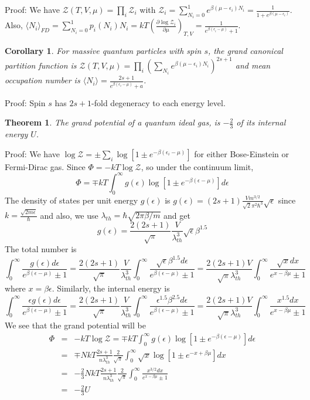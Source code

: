\documentclass[a4paper]{article}
\theoremstyle{new}
\newtheorem{thm}{Theorem}[section]
\newtheorem{cor}{Corollary}[section]
\begin{document}
Proof: We have $\mathcal{Z}(T,V,\mu)=\prod_i\mathcal{Z}_i$ with $\mathcal{Z}_i=\sum_{N_i=0}^1e^{\beta(\mu-\epsilon_i)N_i}=\frac{1}{1+e^{\beta(\mu-\epsilon_i)}}$. Also, $\langle N_i\rangle_{FD}=\sum_{N_i=0}^1p_i(N_i)N_i=kT(\frac{\partial\log\mathcal{Z}_i}{\partial\mu})_{T,V}=\frac{1}{e^{\beta(\epsilon_i-\mu)}+1}$.
\begin{cor}
For massive quantum particles with spin $s$, the grand canonical partition function is $\mathcal{Z}(T,V,\mu)=\prod_i(\sum_{N_i}e^{\beta(\mu-\epsilon_i)N_i})^{2s+1}$ and mean occupation number is $\langle N_i\rangle=\frac{2s+1}{e^{\beta(\epsilon_i-\mu)}+a}$.
\end{cor}
Proof: Spin $s$ has $2s+1$-fold degeneracy to each energy level.
\begin{thm}
The grand potential of a quantum ideal gas, is $-\frac{2}{3}$ of its internal energy $U$.
\end{thm}
Proof: We have $\log\mathcal{Z}=\pm\sum_i\log[1\pm e^{-\beta(\epsilon_i-\mu)}]$ for either Bose-Einstein or Fermi-Dirac gas. Since $\Phi=-kT\log\mathcal{Z}$, so under the continuum limit,
$$\Phi=\mp kT\int_0^\infty g(\epsilon)\log[1\pm e^{-\beta(\epsilon-\mu)}]d\epsilon$$
The density of states per unit energy $g(\epsilon)$ is $g(\epsilon)=(2s+1)\frac{Vm^{3/2}}{\sqrt{2}\pi^2\hbar^3}\sqrt{\epsilon}$ since $k=\frac{\sqrt{2m\epsilon}}{\hbar}$ and also, we use $\lambda_{th}=\hbar\sqrt{2\pi\beta/m}$ and get
$$g(\epsilon)=\frac{2(2s+1)}{\sqrt{\pi}}\frac{V}{\lambda_{th}^3}\sqrt{\epsilon}\beta^{1.5}$$
The total number is $$\int_0^\infty\frac{g(\epsilon)d\epsilon}{e^{\beta(\epsilon-\mu)}\pm1}=\frac{2(2s+1)}{\sqrt{\pi}}\frac{V}{\lambda_{th}^3}\int_0^\infty\frac{\sqrt{\epsilon}\beta^{1.5}d\epsilon}{e^{\beta(\epsilon-\mu)}\pm1}=\frac{2(2s+1)V}{\sqrt{\pi}\lambda_{th}^3}\int_0^\infty\frac{\sqrt{x}dx}{e^{x-\beta\mu}\pm1}$$
where $x=\beta\epsilon$. Similarly, the internal energy is
$$\int_0^\infty\frac{\epsilon g(\epsilon)d\epsilon}{e^{\beta(\epsilon-\mu)}\pm1}=\frac{2(2s+1)}{\sqrt{\pi}}\frac{V}{\lambda_{th}^3}\int_0^\infty\frac{\epsilon^{1.5}\beta^{2.5}d\epsilon}{e^{\beta(\epsilon-\mu)}\pm1}=\frac{2(2s+1)V}{\sqrt{\pi}\lambda_{th}^3}\int_0^\infty\frac{x^{1.5}dx}{e^{x-\beta\mu}\pm1}$$
We see that the grand potential will be
\begin{eqnarray}
\Phi&=&-kT\log\mathcal{Z}=\mp kT\int_0^\infty g(\epsilon)\log[1\pm e^{-\beta(\epsilon-\mu)}]d\epsilon\nonumber\\&=&\mp NkT\frac{2s+1}{n\lambda_{th}^3}\frac{2}{\sqrt{\pi}}\int_0^\infty\sqrt{x}\log[1\pm e^{-x+\beta\mu}]dx\nonumber\\&=&-\frac{2}{3}NkT\frac{2s+1}{n\lambda_{th}^3}\frac{2}{\sqrt{\pi}}\int_0^\infty\frac{x^{3/2}dx}{e^{x-\beta\mu}\pm1}\nonumber\\&=&-\frac{2}{3}U\nonumber
\end{eqnarray}
\end{document}
